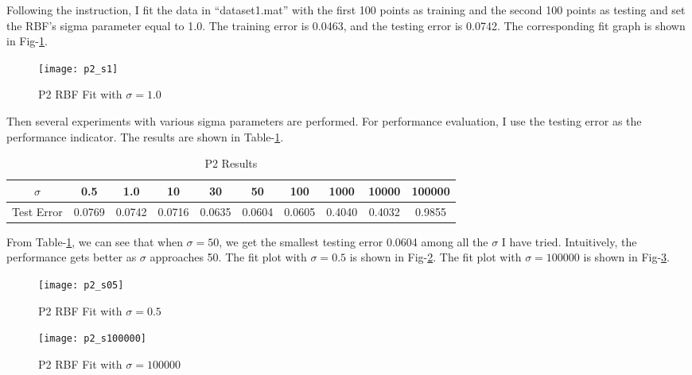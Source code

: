 \documentclass[12pt]{article}
\begin{document}
Following the instruction, I fit the data in ``dataset1.mat'' with the first 100 points as training and the second 100 points as testing and set the RBF's sigma parameter equal to 1.0. The training error is 0.0463, and the testing error is 0.0742. The corresponding fit graph is shown in Fig-\ref{fig:p2_s1}.

\begin{figure}[ht!]
  \centering
  \texttt{[image: p2\_s1]}
  \caption{P2 RBF Fit with $\sigma = 1.0$ \label{fig:p2_s1}}
\end{figure}

Then several experiments with various sigma parameters are performed. For performance evaluation, I use the testing error as the performance indicator. The results are shown in Table-\ref{tab:p2_exp}.

\begin{table}[ht!]
  \begin{center}
    \begin{tabular}{|c|c|c|c|c|c|c|c|c|c|}
      \hline
      $\sigma$	  &   0.5  &  1.0   &  10    &  30    &  50   
      	          &   100  &  1000  & 10000  & 100000 \\ \hline
      Test Error  & 0.0769 & 0.0742 & 0.0716 & 0.0635 & 0.0604
      		  & 0.0605 & 0.4040 & 0.4032 & 0.9855 \\ \hline
    \end{tabular}
  \end{center}
  \caption{P2 Results\label{tab:p2_exp}}
\end{table}

From Table-\ref{tab:p2_exp}, we can see that when $\sigma = 50$, we get the smallest testing error 0.0604 among all the $\sigma$ I have tried. Intuitively, the performance gets better as $\sigma$ approaches 50. The fit plot with $\sigma = 0.5$ is shown in Fig-\ref{fig:p2_s05}. The fit plot with $\sigma = 100000$ is shown in Fig-\ref{fig:p2_s100000}.

\begin{figure}[ht!]
  \centering
  \texttt{[image: p2\_s05]}
  \caption{P2 RBF Fit with $\sigma = 0.5$ \label{fig:p2_s05}}
\end{figure}

\begin{figure}[ht!]
  \centering
  \texttt{[image: p2\_s100000]}
  \caption{P2 RBF Fit with $\sigma = 100000$ \label{fig:p2_s100000}}
\end{figure}
\end{document}
